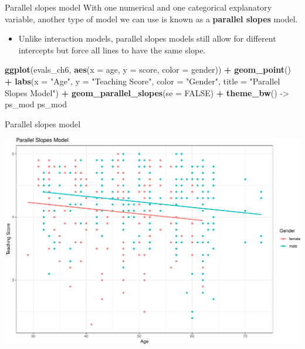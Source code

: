 \documentclass[
  ignorenonframetext,
]{beamer}
\newenvironment{Shaded}{\begin{snugshade}}{\end{snugshade}}
\newcommand{\AttributeTok}[1]{\textcolor[rgb]{0.13,0.29,0.53}{#1}}
\newcommand{\ConstantTok}[1]{\textcolor[rgb]{0.56,0.35,0.01}{#1}}
\newcommand{\FunctionTok}[1]{\textcolor[rgb]{0.13,0.29,0.53}{\textbf{#1}}}
\newcommand{\NormalTok}[1]{#1}
\newcommand{\OtherTok}[1]{\textcolor[rgb]{0.56,0.35,0.01}{#1}}
\newcommand{\SpecialCharTok}[1]{\textcolor[rgb]{0.81,0.36,0.00}{\textbf{#1}}}
\newcommand{\StringTok}[1]{\textcolor[rgb]{0.31,0.60,0.02}{#1}}
\providecommand{\tightlist}{%
  \setlength{\itemsep}{0pt}\setlength{\parskip}{0pt}}
\begin{document}
\begin{frame}[fragile]{Parallel slopes model}
\protect\hypertarget{parallel-slopes-model}{}
With one numerical and one categorical explanatory variable, another
type of model we can use is known as a \textbf{parallel slopes} model.

\begin{itemize}
\tightlist
\item
  Unlike interaction models, parallel slopes models still allow for
  different intercepts but force all lines to have the same slope.
\end{itemize}

\normalsize

\begin{Shaded}
\begin{Highlighting}[]
\FunctionTok{ggplot}\NormalTok{(evals\_ch6, }\FunctionTok{aes}\NormalTok{(}\AttributeTok{x =}\NormalTok{ age, }\AttributeTok{y =}\NormalTok{ score, }\AttributeTok{color =}\NormalTok{ gender)) }\SpecialCharTok{+}
  \FunctionTok{geom\_point}\NormalTok{() }\SpecialCharTok{+}
  \FunctionTok{labs}\NormalTok{(}\AttributeTok{x =} \StringTok{"Age"}\NormalTok{, }\AttributeTok{y =} \StringTok{"Teaching Score"}\NormalTok{, }\AttributeTok{color =} \StringTok{"Gender"}\NormalTok{,}
       \AttributeTok{title =} \StringTok{"Parallel Slopes Model"}\NormalTok{) }\SpecialCharTok{+}
  \FunctionTok{geom\_parallel\_slopes}\NormalTok{(}\AttributeTok{se =} \ConstantTok{FALSE}\NormalTok{) }\SpecialCharTok{+} 
  \FunctionTok{theme\_bw}\NormalTok{() }\OtherTok{{-}\textgreater{}}\NormalTok{ ps\_mod}
\NormalTok{ps\_mod}
\end{Highlighting}
\end{Shaded}

\normalsize
\end{frame}

\begin{frame}{Parallel slopes model}
\protect\hypertarget{parallel-slopes-model-1}{}
\normalsize

\begin{center}\includegraphics[width=0.9\linewidth,height=0.9\textheight]{Week5_Lect_files/figure-beamer/unnamed-chunk-23-1} \end{center}
\normalsize
\end{frame}
\end{document}
